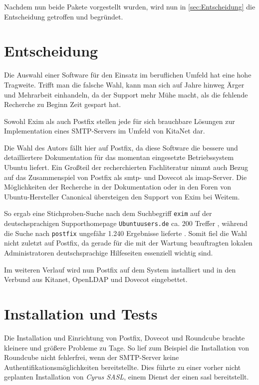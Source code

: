 Nachdem nun beide Pakete vorgestellt wurden, wird nun in \autoref{sec:Entscheidung} die Entscheidung getroffen und begründet.

\chapter{Entscheidung}
\label{sec:Entscheidung}

Die Auswahl einer Software für den Einsatz im beruflichen Umfeld hat eine hohe Tragweite. Trifft man die falsche Wahl, kann man sich auf Jahre hinweg Ärger und Mehrarbeit einhandeln, da der Support mehr Mühe macht, als die fehlende Recherche zu Beginn Zeit gespart hat.

Sowohl Exim als auch Postfix stellen jede für sich brauchbare Lösungen zur Implementation eines SMTP-Servers im Umfeld von KitaNet dar. 

Die Wahl des Autors fällt hier auf Postfix, da diese Software die bessere und detailliertere Dokumentation für das momentan eingesetzte Betriebssystem Ubuntu liefert. Ein Großteil der recherchierten Fachliteratur nimmt auch Bezug auf das Zusammenspiel von Postfix als \ac{smtp}- und Dovecot als \ac{imap}-Server.
Die Möglichkeiten der Recherche in der Dokumentation oder in den Foren von Ubuntu-Hersteller Canonical übersteigen den Support von Exim bei Weitem.

So ergab eine Stichproben-Suche nach dem Suchbegriff \verb+exim+ auf der deutschsprachigen Supporthomepage \verb+Ubuntuusers.de+ ca. 200 Treffer \citep[vgl.][]{googleexim}, während die Suche nach \verb+postfix+ ungefähr 1.240 Ergebnisse lieferte \citep[vgl.][]{googlepostfix}.
Somit fiel die Wahl nicht zuletzt auf Postfix, da gerade für die mit der Wartung beauftragten lokalen Administratoren deutschsprachige Hilfeseiten essenziell wichtig sind.

Im weiteren Verlauf wird nun Postfix auf dem System installiert und in den Verbund aus Kitanet, OpenLDAP und Dovecot eingebettet.

\chapter{Installation und Tests}

Die Installation und Einrichtung von Postfix, Dovecot und Roundcube brachte kleinere und größere Probleme zu Tage. 
So lief zum Beispiel die Installation von Roundcube nicht fehlerfrei, wenn der SMTP-Server keine Authentifikationsmöglichkeiten \citep[vgl. hierzu][]{rfc5248} bereitstellte. 
Dies führte zu einer vorher nicht geplanten Installation von \textit{Cyrus SASL}, einem Dienst der einen \ac{sasl} bereitstellt. 

